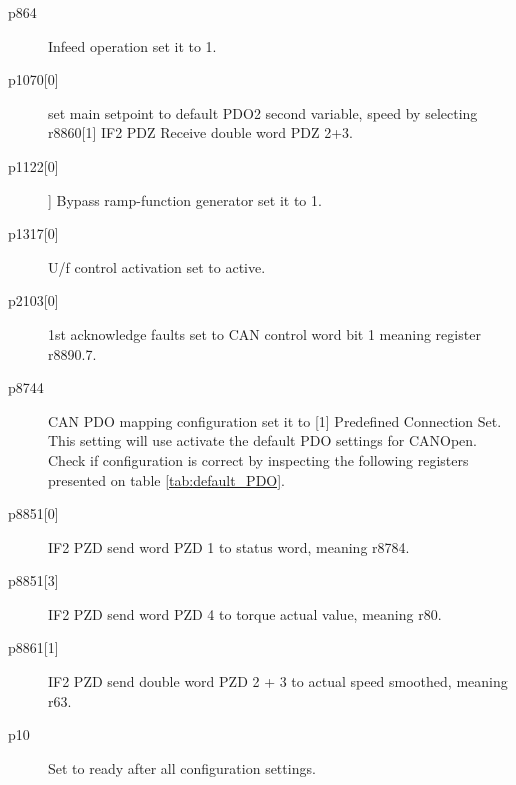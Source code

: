 \begin{description}[align=left, labelwidth=10em, leftmargin=5em, style=nextline]
\begin{description}
		\item[p864] Infeed operation set it to 1.
		\item[p1070{[0]}] set main setpoint to default PDO2 second variable, speed by selecting r8860[1] IF2 PDZ Receive double word PDZ 2+3.
		\item[p1122{[0]}]] Bypass ramp-function generator set it to 1.
		\item[p1317{[0]}] U/f control activation set to active.
		\item[p2103{[0]}] 1st acknowledge faults set to CAN control word bit 1 meaning register r8890.7.
		\item[p8744] CAN PDO mapping configuration set it to [1] Predefined Connection Set. This setting will use activate the default PDO settings for CANOpen. Check if configuration is correct by inspecting the following registers presented on table \ref{tab:default_PDO}.
		\item[p8851{[0]}] IF2 PZD send word PZD 1 to status word, meaning r8784.
		\item[p8851{[3]}] IF2 PZD send word PZD 4 to torque actual value, meaning r80.
		\item[p8861{[1]}] IF2 PZD send double word PZD 2 + 3 to actual speed smoothed, meaning r63.
		\item[p10] Set to ready after all configuration settings.
	\end{description}
\end{description}

